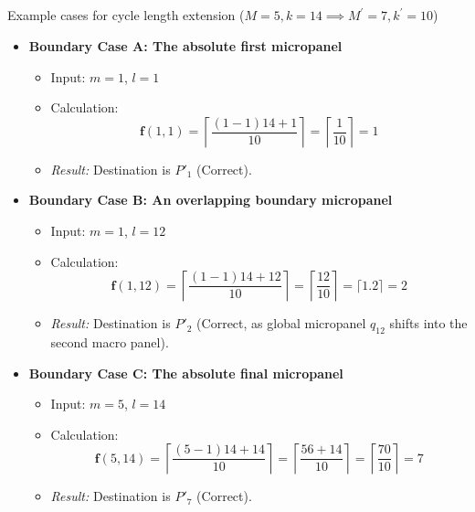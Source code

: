 \documentclass[
  number]{elsarticle}
\makeatletter
\let\oldsubparagraph\subparagraph
\renewcommand{\subparagraph}{
    \@ifstar
      \xxxSubParagraphStar
      \xxxSubParagraphNoStar
  }
\newcommand{\xxxSubParagraphStar}[1]{\oldsubparagraph*{#1}\mbox{}}
\newcommand{\xxxSubParagraphNoStar}[1]{\oldsubparagraph{#1}\mbox{}}
\providecommand{\tightlist}{%
  \setlength{\itemsep}{0pt}\setlength{\parskip}{0pt}}
\makeatother
\begin{document}
\subparagraph{\texorpdfstring{Example cases for cycle length extension
(\(M=5, k=14 \implies M^\prime=7, k^\prime=10\))}{Example cases for cycle length extension (M=5, k=14 \textbackslash implies M\^{}\textbackslash prime=7, k\^{}\textbackslash prime=10)}}\label{example-cases-for-cycle-length-extension-m5-k14-implies-mprime7-kprime10}

\begin{itemize}
\tightlist
\item
  \textbf{Boundary Case A: The absolute first micropanel}

  \begin{itemize}
  \tightlist
  \item
    Input: \(m = 1\), \(l = 1\)
  \item
    Calculation:
    \[\mathbf{f}(1, 1) = \left\lceil \frac{(1 - 1)14 + 1}{10} \right\rceil = \left\lceil \frac{1}{10} \right\rceil = 1\]
  \item
    \emph{Result:} Destination is \textbf{\(P'_1\)} (Correct).
  \end{itemize}
\item
  \textbf{Boundary Case B: An overlapping boundary micropanel}

  \begin{itemize}
  \tightlist
  \item
    Input: \(m = 1\), \(l = 12\)
  \item
    Calculation:
    \[\mathbf{f}(1, 12) = \left\lceil \frac{(1 - 1)14 + 12}{10} \right\rceil 
    = \left\lceil \frac{12}{10} \right\rceil = \lceil 1.2 \rceil = 2\]
  \item
    \emph{Result:} Destination is \textbf{\(P'_2\)} (Correct, as global
    micropanel \(q_{12}\) shifts into the second macro panel).
  \end{itemize}
\item
  \textbf{Boundary Case C: The absolute final micropanel}

  \begin{itemize}
  \tightlist
  \item
    Input: \(m = 5\), \(l = 14\)
  \item
    Calculation:
    \[\mathbf{f}(5, 14) = \left\lceil \frac{(5 - 1)14 + 14}{10} \right\rceil = \left\lceil \frac{56 + 14}{10} \right\rceil = \left\lceil \frac{70}{10} \right\rceil = 7\]
  \item
    \emph{Result:} Destination is \textbf{\(P'_7\)} (Correct).
  \end{itemize}
\end{itemize}
\end{document}
